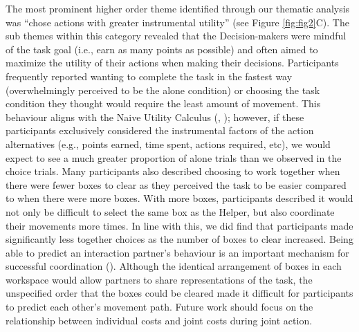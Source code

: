 \documentclass[
  man,
  floatsintext,
  longtable,
  nolmodern,
  notxfonts,
  notimes,
  mask,
  colorlinks=true,linkcolor=blue,citecolor=blue,urlcolor=blue]{apa7}
\begin{document}
The most prominent higher order theme identified through our thematic
analysis was ``chose actions with greater instrumental utility'' (see
Figure \ref{fig:fig2}C). The sub themes within this category revealed
that the Decision-makers were mindful of the task goal (i.e., earn as
many points as possible) and often aimed to maximize the utility of
their actions when making their decisions. Participants frequently
reported wanting to complete the task in the fastest way (overwhelmingly
perceived to be the alone condition) or choosing the task condition they
thought would require the least amount of movement. This behaviour
aligns with the Naive Utility Calculus
(,
); however, if these participants
exclusively considered the instrumental factors of the action
alternatives (e.g., points earned, time spent, actions required, etc),
we would expect to see a much greater proportion of alone trials than we
observed in the choice trials. Many participants also described choosing
to work together when there were fewer boxes to clear as they perceived
the task to be easier compared to when there were more boxes. With more
boxes, participants described it would not only be difficult to select
the same box as the Helper, but also coordinate their movements more
times. In line with this, we did find that participants made
significantly less together choices as the number of boxes to clear
increased. Being able to predict an interaction partner's behaviour is
an important mechanism for successful coordination
(). Although the identical
arrangement of boxes in each workspace would allow partners to share
representations of the task, the unspecified order that the boxes could
be cleared made it difficult for participants to predict each other's
movement path. Future work should focus on the relationship between
individual costs and joint costs during joint action.
\end{document}
